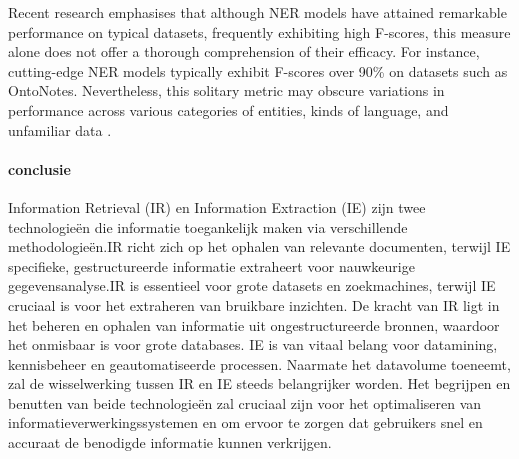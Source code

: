 \begin{itemize}
    Recent research emphasises that although NER models have attained remarkable performance on typical datasets, frequently exhibiting high F-scores, this measure alone does not offer a thorough comprehension of their efficacy. For instance, cutting-edge NER models typically exhibit F-scores over 90\% on datasets such as OntoNotes. Nevertheless, this solitary metric may obscure variations in performance across various categories of entities, kinds of language, and unfamiliar data \autocite{vajjala2022reallyknowstateart}.
    
\end{itemize}

\paragraph{conclusie}
Information Retrieval (IR) en Information Extraction (IE) zijn twee technologieën die informatie toegankelijk maken via verschillende methodologieën.IR richt zich op het ophalen van relevante documenten, terwijl IE specifieke, gestructureerde informatie extraheert voor nauwkeurige gegevensanalyse.IR is essentieel voor grote datasets en zoekmachines, terwijl IE cruciaal is voor het extraheren van bruikbare inzichten. De kracht van IR ligt in het beheren en ophalen van informatie uit ongestructureerde bronnen, waardoor het onmisbaar is voor grote databases. IE is van vitaal belang voor datamining, kennisbeheer en geautomatiseerde processen. Naarmate het datavolume toeneemt, zal de wisselwerking tussen IR en IE steeds belangrijker worden. Het begrijpen en benutten van beide technologieën zal cruciaal zijn voor het optimaliseren van informatieverwerkingssystemen en om ervoor te zorgen dat gebruikers snel en accuraat de benodigde informatie kunnen verkrijgen.

